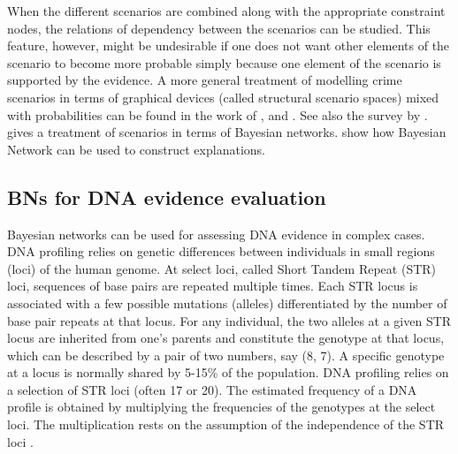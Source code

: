 \documentclass{article}
\begin{document}
When the different scenarios are combined along with the appropriate constraint nodes, the relations of dependency between the  scenarios can be studied. This feature, however, might be undesirable if one does not 
want other elements of the scenario to become more probable simply because  one element of the scenario is supported by the evidence.
%
A more general treatment
of modelling crime scenarios in terms of graphical devices (called structural scenario spaces) mixed with probabilities can be found in the work of 
\cite{shen2007ScenariodrivenDecisionSupporta}, \cite{bex2011ArgumentsStoriesCriminal, bex2015IntegratedTheoryCausal} and
\cite{verheijproof2017}.
See also the survey by \citet{di2018evidential}.
\cite{dawid2018graphical} 
gives a treatment of scenarios in terms of  Bayesian networks. \cite{lacave2002ReviewExplanationMethodsa} show how Bayesian Network can be used to construct explanations.














\subsection{BNs for DNA evidence evaluation} \label{subsec:BNSforDNA}

Bayesian networks can be used 
for assessing DNA evidence in  complex cases. 
DNA profiling relies on genetic differences between individuals 
in small regions (loci) of the human genome. At select loci, called Short Tandem Repeat (STR) loci, sequences of base pairs are repeated multiple times. Each STR locus is associated with a few possible mutations (alleles) differentiated by the number of base pair repeats at that locus.   
For any individual, the two 
alleles at a given STR locus are 
inherited from one's parents and constitute the genotype at that locus, which can be described by a pair of two numbers, say (8, 7). 
A specific genotype at a locus is 
normally shared by 5-15\% of the population. 
%
DNA profiling relies on 
a selection of STR loci (often 17 or 20). The estimated frequency of a DNA profile is obtained 
by multiplying the frequencies of the genotypes at the select loci. The multiplication rests on the assumption of the independence of the STR loci \citep{Kaye2010The-Double-Heli}.
\end{document}
